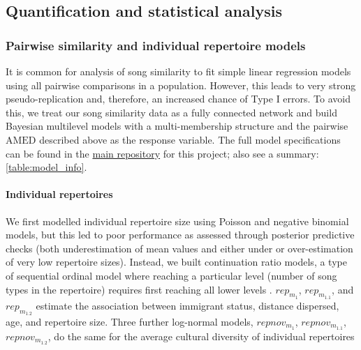 \documentclass[9pt, twocolumn, twoside]{gsajnl}
\begin{document}
\subsection{Quantification and statistical analysis}

\subsubsection{Pairwise similarity and individual repertoire models}

It is common for analysis of song similarity to fit simple linear regression models using all pairwise comparisons in a population. However, this leads to very strong pseudo-replication and, therefore, an increased chance of Type I errors. To avoid this, we treat our song similarity data as a fully connected network and build Bayesian multilevel models with a multi-membership structure and the pairwise $\text{AMED}$ described above as the response variable. The full model specifications can be found in the \href{https://github.com/nilomr/birdsong-demography}{main repository} for this project; also see a summary: \autoref{table:model_info}.

\paragraph{Individual repertoires}
We first modelled individual repertoire size using Poisson and negative binomial models, but this led to poor performance as assessed through posterior predictive checks (both underestimation of mean values and either under or over-estimation of very low repertoire sizes). Instead, we built continuation ratio models, a type of sequential ordinal model where reaching a particular level (number of song types in the repertoire) requires first reaching all lower levels \parencite{chambers2023, warti2020}. $rep_{m_1}$, $rep_{m_{1.1}}$, and $rep_{m_{1.2}}$ estimate the association between immigrant status, distance dispersed, age, and repertoire size. Three further log-normal models, $repnov_{m_1}$, $repnov_{m_{1.1}}$, $repnov_{m_{1.2}}$, do the same for the average cultural diversity of individual repertoires
\end{document}
